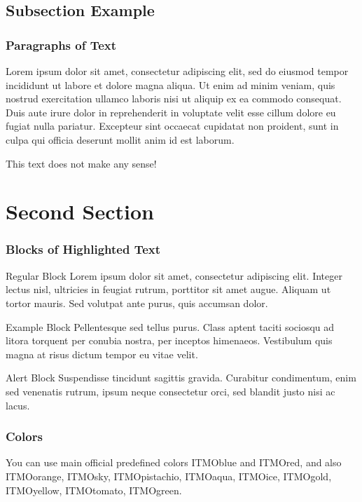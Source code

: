 \documentclass[aspectratio=169]{beamer}
\begin{document}
\subsection{Subsection Example} 

\begin{frame}
\frametitle{Paragraphs of Text}
Lorem ipsum dolor sit amet, consectetur adipiscing elit, sed do eiusmod tempor incididunt ut labore et dolore magna aliqua. Ut enim ad minim veniam, quis nostrud exercitation ullamco laboris nisi ut aliquip ex ea commodo consequat. Duis aute irure dolor in reprehenderit in voluptate velit esse cillum dolore eu fugiat nulla pariatur. Excepteur sint occaecat cupidatat non proident, sunt in culpa qui officia deserunt mollit anim id est laborum.

\alert{This text does not make any sense!}

\end{frame}


\section{Second Section} 

\begin{frame}
\frametitle{Blocks of Highlighted Text}
\begin{block}{Regular Block}
Lorem ipsum dolor sit amet, consectetur adipiscing elit. Integer lectus nisl, ultricies in feugiat rutrum, porttitor sit amet augue. Aliquam ut tortor mauris. Sed volutpat ante purus, quis accumsan dolor.
\end{block}

\begin{exampleblock}{Example Block}
Pellentesque sed tellus purus. Class aptent taciti sociosqu ad litora torquent per conubia nostra, per inceptos himenaeos. Vestibulum quis magna at risus dictum tempor eu vitae velit.
\end{exampleblock}

\begin{alertblock}{Alert Block}
Suspendisse tincidunt sagittis gravida. Curabitur condimentum, enim sed venenatis rutrum, ipsum neque consectetur orci, sed blandit justo nisi ac lacus.
\end{alertblock}
\end{frame}


\begin{frame}
\frametitle{Colors}

You can use main official predefined colors 
\textcolor{ITMOblue}{ITMOblue} and \textcolor{ITMOred}{ITMOred}, and also
 \textcolor{ITMOorange}{ITMOorange}, \textcolor{ITMOsky}{ITMOsky}, \textcolor{ITMOpistachio}{ITMOpistachio}, \textcolor{ITMOaqua}{ITMOaqua}, \textcolor{ITMOice}{ITMOice}, \textcolor{ITMOgold}{ITMOgold}, \textcolor{ITMOyellow}{ITMOyellow}, \textcolor{ITMOtomato}{ITMOtomato}, \textcolor{ITMOgreen}{ITMOgreen}.

\end{frame}
\end{document}
